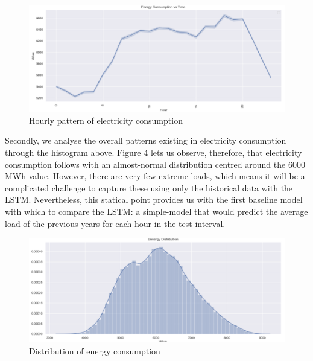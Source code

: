 \documentclass[10pt,twocolumn,letterpaper]{article}
\begin{document}
\begin{figure}[h]
\begin{center}
   \includegraphics[width=\linewidth]{midterm-report-latex/Time.png}
\end{center}
   \caption{Hourly pattern of electricity consumption}
\label{fig:google-scholar-1col}
\end{figure}

Secondly, we analyse the overall patterns existing in electricity consumption through the histogram above. Figure 4 lets us observe, therefore, that electricity consumption follows with an almost-normal distribution centred around the 6000 MWh value. However, there are very few extreme loads, which means it will be a complicated challenge to capture these using only the historical data with the LSTM. Nevertheless, this statical point provides us with the first baseline model with which to compare the LSTM: a simple-model that would predict the average load of the previous years for each hour in the test interval. 

\begin{figure}[H]
\begin{center}
   \includegraphics[width=\linewidth]{midterm-report-latex/energy.png}
\end{center}
   \caption{Distribution of energy consumption}
\end{figure}
\end{document}
